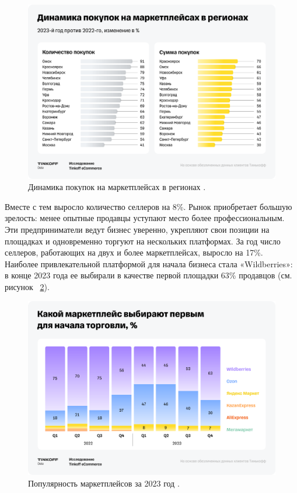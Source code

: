 \documentclass[a4paper,12pt]{extarticle}
\begin{document}
\begin{figure}[hbtp]
	\centering
	\includegraphics[scale=0.3]{marketplaces-regions.png}
	\caption{Динамика покупок на маркетплейсах в регионах \cite{tinkoffresearch}.}
	\label{fig:marketplaces-regions}
\end{figure}  

Вместе с тем выросло количество селлеров на 8\%. Рынок приобретает большую зрелость: менее опытные продавцы уступают место более профессиональным. Эти предприниматели ведут бизнес уверенно, укрепляют свои позиции на площадках и одновременно торгуют на нескольких платформах. За год число селлеров, работающих на двух и более маркетплейсах, выросло на 17\%. Наиболее привлекательной платформой для начала бизнеса стала «Wildberries»: в конце 2023 года ее выбирали в качестве первой площадки 63\% продавцов (см. рисунок ~\ref{fig:marketplaces-top}).

\begin{figure}[hbtp]
	\centering
	\includegraphics[scale=0.3]{marketplaces-top.png}
	\caption{Популярность маркетплейсов за 2023 год \cite{tinkoffresearch}.}
	\label{fig:marketplaces-top}
\end{figure} 
\end{document}
